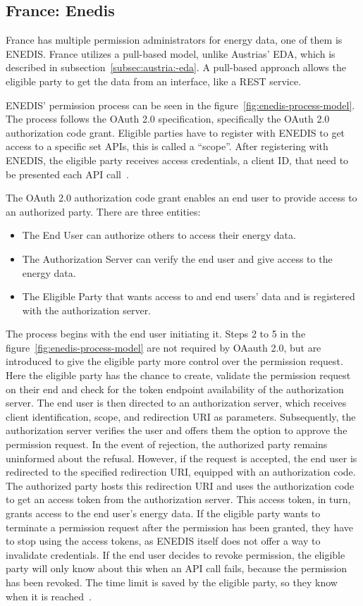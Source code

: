 \subsection{France: Enedis}\label{subsec:france:-enedis}
France has multiple permission administrators for energy data, one of them is ENEDIS.
France utilizes a pull-based model, unlike Austrias' EDA, which is described in subsection\ \ref{subsec:austria:-eda}.
A pull-based approach allows the eligible party to get the data from an interface, like a REST service.

ENEDIS' permission process can be seen in the figure\ \ref{fig:enedis-process-model}.
The process follows the OAuth 2.0 specification, specifically the OAuth 2.0 authorization code grant.
Eligible parties have to register with ENEDIS to get access to a specific set APIs, this is called a ``scope''.
After registering with ENEDIS, the eligible party receives access credentials, a client ID, that need to be presented each API call~\cite{rfc6749-oauth, enedis-dev-guide}.

The OAuth 2.0 authorization code grant enables an end user to provide access to an authorized party.
There are three entities:
\begin{itemize}
    \item{The End User} can authorize others to access their energy data.
    \item{The Authorization Server} can verify the end user and give access to the energy data.
    \item{The Eligible Party} that wants access to and end users' data and is registered with the authorization server.
\end{itemize}
The process begins with the end user initiating it.
Steps 2 to 5 in the figure\ \ref{fig:enedis-process-model} are not required by OAauth 2.0, but are introduced to give the eligible party more control over the permission request.
Here the eligible party has the chance to create, validate the permission request on their end and check for the token endpoint availability of the authorization server.
The end user is then directed to an authorization server, which receives client identification, scope, and redirection URI as parameters.
Subsequently, the authorization server verifies the user and offers them the option to approve the permission request.
In the event of rejection, the authorized party remains uninformed about the refusal.
However, if the request is accepted, the end user is redirected to the specified redirection URI, equipped with an authorization code.
The authorized party hosts this redirection URI and uses the authorization code to get an access token from the authorization server.
This access token, in turn, grants access to the end user's energy data.
If the eligible party wants to terminate a permission request after the permission has been granted, they have to stop using the access tokens, as ENEDIS itself does not offer a way to invalidate credentials.
If the end user decides to revoke permission, the eligible party will only know about this when an API call fails, because the permission has been revoked.
The time limit is saved by the eligible party, so they know when it is reached~\cite{enedis-dev-guide,rfc6749-oauth}.

